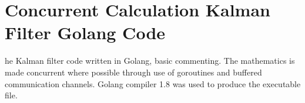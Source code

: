 \chapter{Concurrent Calculation Kalman Filter Golang Code}
\label{app:Goconcurrent}

he Kalman filter code written in Golang, basic commenting. The mathematics is made concurrent where possible through use of goroutines and buffered communication channels. Golang compiler 1.8 was used to produce the executable file.
\newline



